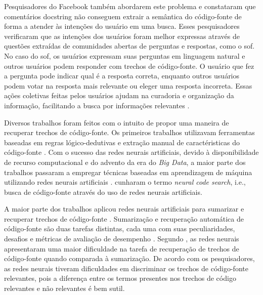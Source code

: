 Pesquisadores do Facebook \citep{cambronero-deep-learning-code-search:2019} também abordarem este problema e constataram que comentários \gls{docstring} não conseguem extrair a semântica do código-fonte de forma a atender às intenções do usuário em uma busca. Esses pesquisadores verificaram que as intenções dos usuários foram melhor expressas através de questões extraídas de comunidades abertas de perguntas e respostas, como o \gls{sof}. No caso do \Gls{sof}, os usuários expressam suas perguntas em linguagem natural e outros usuários podem responder com trechos de código-fonte. O usuário que fez a pergunta pode indicar qual é a resposta correta, enquanto outros usuários podem votar na resposta mais relevante ou eleger uma resposta incorreta. Essas ações coletivas feitas pelos usuários ajudam na curadoria e organização da informação, facilitando a busca por informações relevantes \citep{Wang-quora:2013, cambronero-deep-learning-code-search:2019}. 


Diversos trabalhos foram feitos com o intuito de propor uma maneira de recuperar trechos de código-fonte. Os primeiros trabalhos utilizavam ferramentas baseadas em regras lógico-dedutivas e extração manual de caractéristicas do código-fonte \citep{Allamanis:2018:SML}. Com o sucesso das redes neurais artificiais, devido à disponibilidade de recurso computacional e do advento da era do \textit{Big Data}, a maior parte dos trabalhos passaram a empregar técnicas baseadas em aprendizagem de máquina utilizando redes neurais artificiais \citep{Gu-deep-code-search:2018, yao-2018, iyer-etal-2016-summarizing, Allamanis-bimodal-source-code-natural-language:2015, Chen-bi-variational-autoencoder:2018, Sachdev-neural-code-search:2018, cambronero-deep-learning-code-search:2019}. \cite{cambronero-deep-learning-code-search:2019} cunharam o termo \textit{neural code search}, i.e., busca de código-fonte através do uso de redes neurais artificiais.

A maior parte dos trabalhos aplicou redes neurais artificiais para sumarizar e recuperar trechos de código-fonte \citep{iyer-etal-2016-summarizing, Allamanis-bimodal-source-code-natural-language:2015, Chen-bi-variational-autoencoder:2018}. Sumarização e recuperação automática de código-fonte são duas tarefas distintas, cada uma com suas peculiaridades, desafios e métricas de avaliação de desempenho \citep{allahyari-text-summarization-2017}. Segundo \cite{Allamanis-bimodal-source-code-natural-language:2015}, as redes neurais apresentaram uma maior dificuldade na tarefa de recuperação de trechos de código-fonte quando comparada à sumarização. De acordo com os pesquisadores, as redes neurais tiveram dificuldades em discriminar os trechos de código-fonte relevantes, pois a diferença entre os termos presentes nos trechos de código relevantes e não relevantes é bem sutil.

